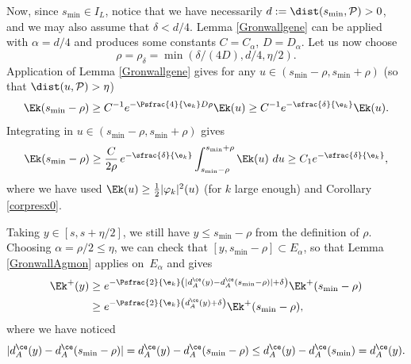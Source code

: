 Now, since $s_{\min} \in I_L$, notice that we have necessarily $d:=\dist(s_{\min},\mathcal{P})>0$, and we may also assume that $\delta<d/4$.
Lemma \ref{Gronwallgene} can be applied with $\alpha=d/4$ and produces some constants $C=C_{\alpha}$, $D=D_{\alpha}$. Let us now choose
\[
\rho=\rho_{\delta}=\min(\delta/(4D),d/4, \eta/2).
\]
Application of Lemma \ref{Gronwallgene} gives for any $u\in (s_{\min}-\rho,s_{\min}+\rho) $ (so that $\dist(u,\mathcal{P})>\eta$)
\[
\Ek(s_{\min}-\rho)\geq C^{-1}e^{-\Psfrac{4}{\e_k}D\rho}\Ek(u)\geq C^{-1}e^{-\sfrac{\delta}{\e_k}}\Ek(u).
\]
Integrating in $u\in (s_{\min}-\rho,s_{\min}+\rho) $ gives
\begin{equation}
\label{inegEk}
\Ek(s_{\min}-\rho)\geq \frac{C}{2\rho}\,e^{-\sfrac{\delta}{\e_k}}\int_{s_{\min}-\rho}^{s_{\min}+\rho} \Ek(u)~du \geq C_1e^{-\sfrac{\delta}{\e_k}},
\end{equation}
where we have used $\Ek(u)\geq \frac12 |\varphi_k|^2(u)$ (for $k$ large enough) and Corollary \ref{corpresx0}.

Taking $y\in [s,s+\eta/2]$, we still have $y\leq s_{\min}-\rho$ from the definition of $\rho$. Choosing $\alpha=\rho/2\leq \eta$, we can check that $[y,s_{\min}-\rho]\subset E_{\alpha}$, so that Lemma \ref{GronwallAgmon} applies on~$E_{\alpha}$ and gives
\begin{equation}
\label{inegdaeta}
\begin{split}
\Ek^+(y)&\geq e^{ -\Psfrac{2}{\e_k}\left(|d_A^{\ce}(y)-d_A^{\ce}(s_{\min}-\rho)|+\delta\right)}\Ek^+(s_{\min}-\rho)\\
&\geq e^{-\Psfrac{2}{\e_k}\left(d_A^{\ce}(y)+\delta\right)}\Ek^+(s_{\min}-\rho),
\end{split}
\end{equation}
where we have noticed
\[
|d_A^{\ce}(y)-d_A^{\ce}(s_{\min}-\rho)|= d_A^{\ce}(y)-d_A^{\ce}(s_{\min}-\rho) \leq d_A^{\ce}(y)-d_A^{\ce}(s_{\min}) = d_A^{\ce}(y).
\]

